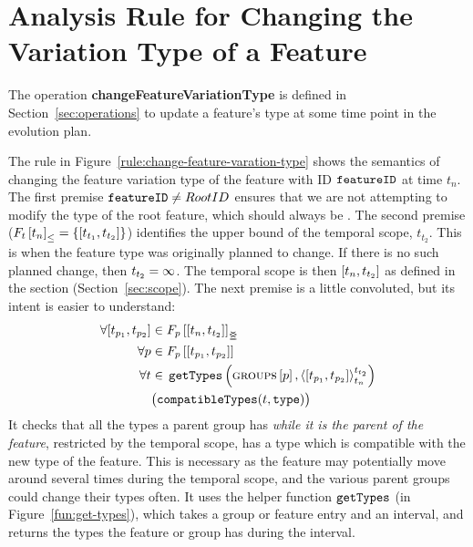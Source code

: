 \section{Analysis Rule for Changing the Variation Type of a Feature}
\label{sec:change-feature-variation-type-rule}
The operation \textbf{changeFeatureVariationType} is defined in Section~\ref{sec:operations} to update a feature's type at some time point in the evolution plan.

The rule in Figure~\ref{rule:change-feature-varation-type} shows the semantics of changing the feature variation type of the feature with ID $\texttt{feature\-ID}$ at time $t_n$. The first premise $\texttt{feature\-ID} \neq Root\-ID$ ensures that we are not attempting to modify the type of the root feature, which should always be \mandatory{}. The second premise ($\containing{F_t}{t_n} = \set{\interval{t_{t_1}}{t_{t_2}}}$) identifies the upper bound of the temporal scope, $t_{t_2}$. This is when the feature type was originally planned to change. If there is no such planned change, then $t_{t_2} = \infty$. The temporal scope is then $\interval{t_n}{t_{t_2}}$ as defined in the  section (Section~\ref{sec:scope}). %
The next premise is a little convoluted, but its intent is easier to understand:
\begin{align*}
   \forall \interval{t_{p_1}}{t_{p_2}} & \in \overlapping{F_p}{t_n}{t_{t_2}}  \\ %
   \forall p & \in \lookup{F_p}{\interval{t_{p_1}}{t_{p_2}}}  \\%
   \forall t & \in \, \var{getTypes}\left(\lookup{\groups}{p}, \clamp{\interval{t_{p_1}}{t_{p_2}}}{t_n}{t_{t_2}}\right)  \\
            & \big(\var{compatibleTypes}(t, \var{type})\big) 
\end{align*}
It checks that all the types a parent group has \emph{while it is the parent of the feature}, restricted by the temporal scope, has a type which is compatible with the new type of the feature. This is necessary as the feature may potentially move around several times during the temporal scope, and the various parent groups could change their types often. It uses the helper function $\texttt{get\-Types}$ (in Figure~\ref{fun:get-types}), which takes a group or feature entry and an interval, and returns the types the feature or group has during the interval.

